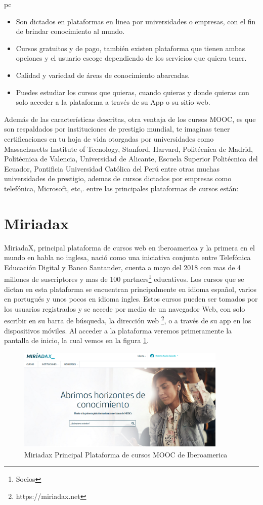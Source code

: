 pc\documentclass[a4paper,12pt,openany]{book}
\begin{document}
\begin{itemize}
\item Son dictados en plataformas en linea por universidades o empresas, con el fin de brindar conocimiento al mundo.
\item Cursos gratuitos y de pago, también existen plataforma que tienen ambas opciones y el usuario escoge dependiendo de los servicios que quiera tener.
\item Calidad y variedad de áreas de conocimiento abarcadas.
\item Puedes estudiar los cursos que quieras, cuando quieras y donde quieras con solo acceder a la plataforma a través de su App o su sitio web.
\end{itemize}

Además de las características descritas, otra ventaja de los cursos MOOC, es que son respaldados por instituciones de prestigio mundial, te imaginas tener certificaciones en tu hoja de vida otorgadas por universidades como Massachusetts Institute of Tecnology, Stanford, Harvard, Politécnica de Madrid, Politécnica de Valencia, Universidad de Alicante, Escuela Superior Politécnica del Ecuador, Pontificia Universidad Católica del Perú entre otras muchas universidades de prestigio, ademas de cursos dictados por empresas como telefónica, Microsoft, etc,. entre las principales plataformas de cursos están: 

\section{Miriadax}

MiriadaX, principal plataforma de cursos web en iberoamerica y la primera en el mundo en habla no inglesa, nació como una iniciativa conjunta entre Telefónica Educación Digital y Banco Santander, cuenta a mayo del 2018 con mas de 4 millones de suscriptores y mas de 100 partners\footnote{Socios} educativos. Los cursos que se dictan en esta plataforma se encuentran principalmente en idioma español, varios en portugués y unos pocos en idioma ingles. Estos cursos pueden ser tomados por los usuarios registrados y se accede por medio de  un navegador Web, con solo escribir en su barra de búsqueda, la dirección web \footnote{https://miriadax.net}, o a través de su app en los dispositivos móviles. Al acceder a la plataforma veremos primeramente la pantalla de inicio, la cual vemos en la figura \ref{fig:miriada1}. 

\begin{figure}[ht]
  \centering
	\includegraphics[width=10cm]{miriada1.png}
\caption{Miriadax Principal Plataforma de cursos MOOC de Iberoamerica}
  \label{fig:miriada1}
\end{figure}
\end{document}
